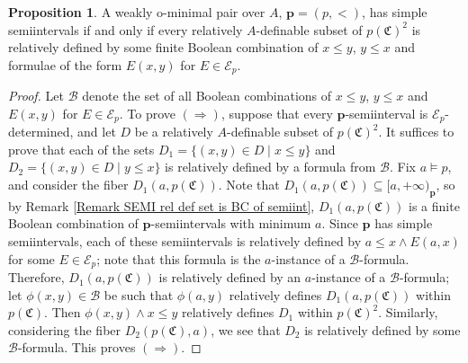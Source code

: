\documentclass{amsart}
\theoremstyle{definition}
\newtheorem{Proposition}[Theorem]{Proposition}
\theoremstyle{definition}
\newcommand{\Mon}{\mathfrak C}
\begin{document}
\begin{Proposition}\label{Prop_simple_semiintervals_basic}
A weakly o-minimal pair over $A$, $\mathbf p=(p,<)$, has simple semiintervals if and only if every relatively $A$-definable subset of $p(\Mon)^2$ is relatively defined by some finite Boolean combination of $x\leqslant y$, $y\leqslant x$ and formulae of the form $E(x,y)$ for $E\in\mathcal E_p$.
\end{Proposition}
\begin{proof} 
Let $\mathcal B$ denote the set of all Boolean combinations of $x\leqslant y$, $y\leqslant x$ and $E(x,y)$ for $E\in\mathcal E_p$.
To prove $(\Rightarrow)$, suppose that every $\mathbf p$-semiinterval is $\mathcal E_p$-determined, and let $D$ be a relatively $A$-definable subset of $p(\Mon)^2$. 
It suffices to prove that each of the sets $D_1=\{(x,y)\in D\mid x\leqslant y\}$ and $D_2=\{(x,y)\in D\mid y\leqslant x\}$ is relatively defined by a formula from $\mathcal B$. Fix $a\models p$, and consider the fiber $D_1(a,p(\Mon))$. Note that $D_1(a,p(\Mon))\subseteq [a,+\infty)_{\mathbf p}$, so by Remark \ref{Remark SEMI rel def set is BC of semiint}, $D_1(a,p(\Mon))$ is a finite Boolean combination of $\mathbf p$-semiintervals with minimum $a$. Since $\mathbf p$ has simple semiintervals, each of these semiintervals is relatively defined by $a\leqslant x\land E(a,x)$ for some $E\in\mathcal E_p$; note that this formula is the $a$-instance of a $\mathcal B$-formula. 
Therefore, $D_1(a,p(\Mon))$ is relatively defined by an $a$-instance of a $\mathcal B$-formula; let $\phi(x,y)\in\mathcal B$ be such that $\phi(a,y)$ relatively defines $D_1(a,p(\Mon))$ within $p(\Mon)$. Then $\phi(x,y)\land x\leqslant y$ relatively defines $D_1$ within $p(\Mon)^2$. 
Similarly, considering the fiber $D_2(p(\Mon),a)$, we see that $D_2$ is relatively defined by some $\mathcal B$-formula. This proves $(\Rightarrow)$.


\end{proof}
\end{document}

